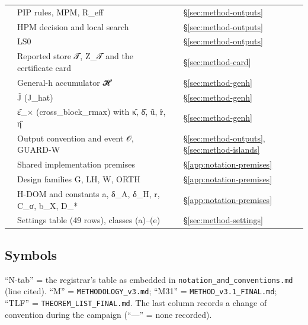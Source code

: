 {\begin{xltabular}{\linewidth}{@{}l>{\raggedright\arraybackslash}X>{\raggedright\arraybackslash}p{4.2cm}>{\raggedright\arraybackslash}p{2.6cm}@{}}
 & PIP rules, MPM, R\_eff &  & \S\ref{sec:method-outputs} \\
 & HPM decision and local search &  & \S\ref{sec:method-outputs} \\
 & LS0 &  & \S\ref{sec:method-outputs} \\
 & Reported store 𝒯, Z\_𝒯 and the certificate card &  & \S\ref{sec:method-card} \\
 & General-h accumulator 𝓗 &  & \S\ref{sec:method-genh} \\
 & Ĵ (J\_hat) &  & \S\ref{sec:method-genh} \\
 & ε̂\_× (cross\_block\_rmax) with κ̂, δ̂, ū̂, r̂, η̂ &  & \S\ref{sec:method-genh} \\
 & Output convention and event 𝒪, GUARD-W &  & \S\ref{sec:method-outputs}, \S\ref{sec:method-islands} \\
 & Shared implementation premises &  & \S\ref{app:notation-premises} \\
 & Design families G, LH, W, ORTH &  & \S\ref{app:notation-premises} \\
 & H-DOM and constants a, δ\_A, δ\_H, r, C\_σ, b\_X, D\_* &  & \S\ref{app:notation-premises} \\
 & Settings table (49 rows), classes (a)–(e) &  & \S\ref{sec:method-settings} \\
\bottomrule
\end{xltabular}
}

\subsection{Symbols}\label{app:notation-symbols}

``N-tab'' = the registrar's table as embedded in \texttt{notation\_and\_conventions.md} (line cited). ``M'' =
\texttt{METHODOLOGY\_v3.md}; ``M31'' = \texttt{METHOD\_v3.1\_FINAL.md}; ``TLF'' = \texttt{THEOREM\_LIST\_FINAL.md}. The last
column records a change of convention during the campaign (``—'' = none recorded).

